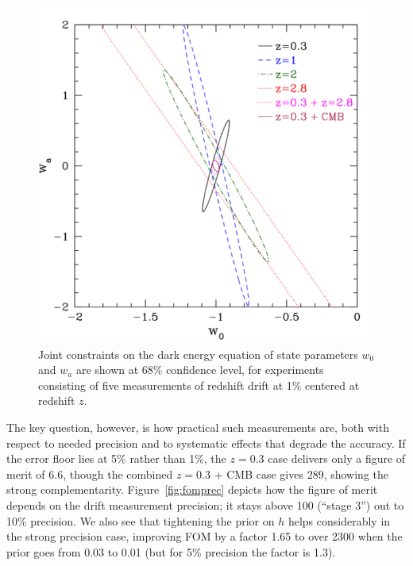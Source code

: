 \documentclass[preprint2, 10pt]{aastex}
\begin{document}
\begin{figure}[!htbp] 
   \centering
  \includegraphics[width=\columnwidth]{w0wazpluscmb.pdf}
\caption{Joint constraints on the dark energy equation of state parameters 
$w_0$ and $w_a$ are shown at 68\% confidence level, for experiments 
consisting of five measurements of redshift drift at 1\% centered at 
redshift $z$. 
} 
\label{fig:fisher} 
\end{figure}


The key question, however, is how practical such measurements are, both 
with respect to needed precision and to systematic effects that degrade 
the accuracy. If the error floor lies at 5\% rather than 1\%, the $z=0.3$ 
case delivers only a figure of merit of 6.6, though the combined $z=0.3$ + 
CMB case gives 289, showing the strong complementarity. 
Figure~\ref{fig:fomprec} depicts how the figure of merit depends on the 
drift measurement precision; it stays above 100 (``stage 3'') out to 10\% 
precision. We also see that tightening the prior on $h$ helps considerably 
in the strong precision case, improving FOM by a factor 1.65 to over 2300 
when the prior goes from 0.03 to 0.01 (but for 5\% precision the factor is 
1.3). 
\end{document}
